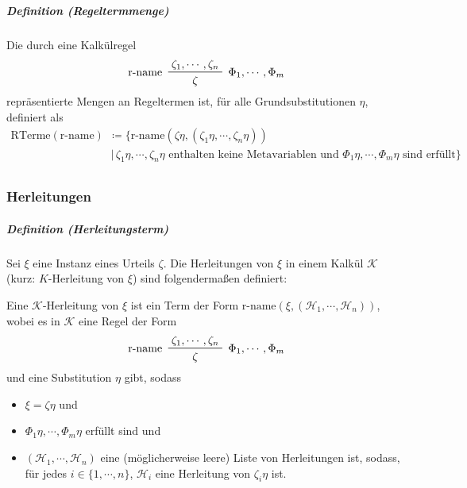\documentclass[a4paper, 11pt, accentcolor = tud3b]{tudreport}
\newcommand{\forwhich}{\ensuremath{{\,\vert\,}}}
\newcommand{\definition}[2]{\subparagraph{Definition (#1)} #2}
\begin{document}
					\definition{Regeltermmenge}{
						Die durch eine Kalkülregel
						\begin{equation*}
							\prftree[l, r]
								{ $ \Phi _ 1, \cdots, \Phi _ m $ }
								{ r-name }
								{ \zeta _ 1, \cdots, \zeta _ n }
								{ \zeta }
						\end{equation*}
						repräsentierte Mengen an Regeltermen ist, für alle Grundsubstitutionen $ \eta $, definiert als
						\begin{align*}
							\text{RTerme}(\text{r-name}) & \coloneqq \{ \text{r-name}(\zeta\eta, (\zeta _ 1 \eta, \cdots, \zeta _ n \eta)) \\
								& \forwhich \zeta _ 1 \eta, \cdots, \zeta _ n \eta \text{ enthalten keine Metavariablen und } \Phi _ 1 \eta, \cdots, \Phi _ m \eta \text{ sind erfüllt} \} \\
						\end{align*}
					}
			    
			    \subsubsection{Herleitungen}
				    \definition{Herleitungsterm}{
					    Sei $ \xi $ eine Instanz eines Urteils $ \zeta $. Die Herleitungen von $ \xi $ in einem Kalkül $ \mathcal{K} $ (kurz: $ K $-Herleitung von $ \xi $) sind folgendermaßen definiert:
					    
					    Eine $ \mathcal{K} $-Herleitung von $ \xi $ ist ein Term der Form $ \text{r-name}(\xi, (\mathcal{H} _ 1, \cdots, \mathcal{H} _ n)) $, wobei es in $ \mathcal{K} $ eine Regel der Form
					    \begin{equation*}
						    \prftree[l, r]
							    { $ \Phi _ 1, \cdots, \Phi _ m $ }
							    { r-name }
							    { \zeta _ 1, \cdots, \zeta _ n }
							    { \zeta }
					    \end{equation*}
					    und eine Substitution $ \eta $ gibt, sodass
					    \begin{itemize}
					    	\item $ \xi = \zeta\eta $ und
					    	\item $ \Phi _ 1 \eta, \cdots, \Phi _ m \eta $ erfüllt sind und
					    	\item $ (\mathcal{H} _ 1, \cdots, \mathcal{H} _ n) $ eine (möglicherweise leere) Liste von Herleitungen ist, sodass, für jedes $ i \in \{ 1, \cdots, n \} $, $ \mathcal{H} _ i $ eine Herleitung von $ \zeta _ i \eta $ ist.
					    \end{itemize}
				    }
				    
\end{document}
